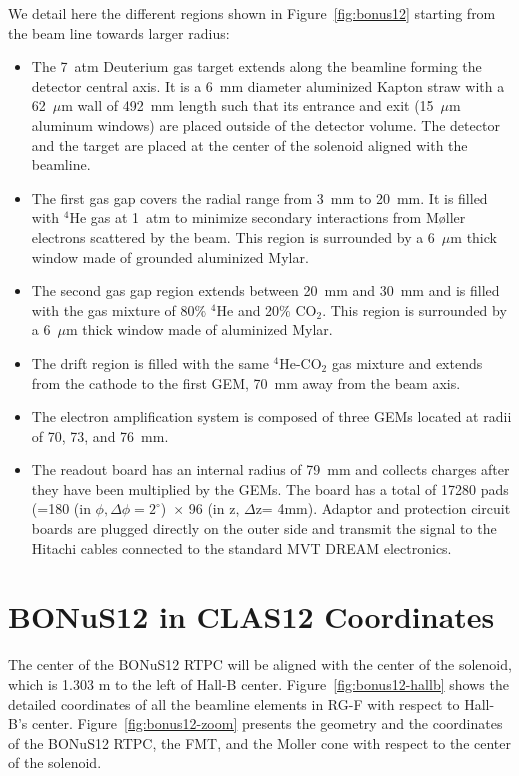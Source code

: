 \documentclass[12pt]{article}
\begin{document}
We detail here the different regions shown in Figure~\ref{fig:bonus12} starting 
from the beam line towards larger radius:\\
\begin{itemize}
  \item The 7~atm Deuterium gas target extends along the beamline forming the 
     detector central axis. It is a 6~mm diameter aluminized Kapton straw with 
      a 62~$\mu$m wall of 492~mm length such that its entrance and exit  
      (15~$\mu$m aluminum windows) are placed outside of the detector volume.  
   The detector and the target are placed at the center of the solenoid aligned 
with the beamline.  
\item The first gas gap covers the radial range from 3~mm to 20~mm. It is 
   filled with $^{4}$He gas at 1~atm to minimize secondary interactions from
      M\o{}ller electrons scattered by the beam. This region is surrounded by a 
      6~$\mu$m thick window made of grounded aluminized Mylar.
   \item The second gas gap region extends between 20~mm and 30~mm and is 
      filled with the gas mixture of 80$\%$ $^{4}$He and 20$\%$ CO$_2$. This 
      region is surrounded by a 6~$\mu$m thick window made of aluminized Mylar.
   \item The drift region is filled with the same $^4$He-CO$_2$ gas mixture and 
      extends from the cathode to the first GEM, 70~mm away from the beam axis.  
     
   \item The electron amplification system is composed of three GEMs located at 
   radii of 70, 73, and 76~mm.  

   \item The readout board has an internal radius of 79~mm and collects charges 
      after they have been multiplied by the GEMs. The board has a total of 
      17280 pads (=180 (in $\phi, \Delta \phi = 2^{\circ}$)~$\times$ 96 (in z, 
      $\Delta$z= 4mm). Adaptor and protection circuit boards are plugged 
      directly on the outer side and transmit the signal to the Hitachi cables 
      connected to the standard MVT DREAM electronics.
\end{itemize}



\section{BONuS12 in CLAS12 Coordinates}

The center of the BONuS12 RTPC will be aligned with the center of the solenoid, 
which is 1.303 m to the left of Hall-B center. Figure~\ref{fig:bonus12-hallb} 
shows the detailed coordinates of all the beamline elements in RG-F with 
respect to Hall-B's center. Figure~\ref{fig:bonus12-zoom} presents the geometry 
and the coordinates of the BONuS12 RTPC, the FMT, and the Moller cone with 
respect to the center of the solenoid.  
\end{document}
